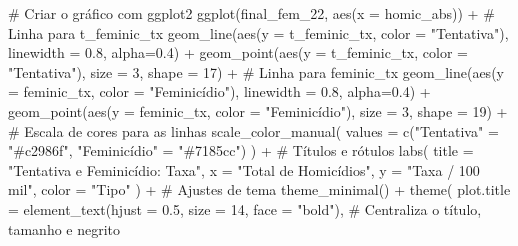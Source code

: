 \documentclass[
  letterpaper,
  DIV=11,
  numbers=noendperiod]{scrreprt}
\newenvironment{Shaded}{\begin{snugshade}}{\end{snugshade}}
\newcommand{\AttributeTok}[1]{\textcolor[rgb]{0.40,0.45,0.13}{#1}}
\newcommand{\CommentTok}[1]{\textcolor[rgb]{0.37,0.37,0.37}{#1}}
\newcommand{\DecValTok}[1]{\textcolor[rgb]{0.68,0.00,0.00}{#1}}
\newcommand{\FloatTok}[1]{\textcolor[rgb]{0.68,0.00,0.00}{#1}}
\newcommand{\FunctionTok}[1]{\textcolor[rgb]{0.28,0.35,0.67}{#1}}
\newcommand{\NormalTok}[1]{\textcolor[rgb]{0.00,0.23,0.31}{#1}}
\newcommand{\OtherTok}[1]{\textcolor[rgb]{0.00,0.23,0.31}{#1}}
\newcommand{\SpecialCharTok}[1]{\textcolor[rgb]{0.37,0.37,0.37}{#1}}
\newcommand{\StringTok}[1]{\textcolor[rgb]{0.13,0.47,0.30}{#1}}
\begin{document}
\begin{Shaded}
\begin{Highlighting}[]
\CommentTok{\# Criar o gráfico com ggplot2}
\FunctionTok{ggplot}\NormalTok{(final\_fem\_22, }\FunctionTok{aes}\NormalTok{(}\AttributeTok{x =}\NormalTok{ homic\_abs)) }\SpecialCharTok{+}
\CommentTok{\# Linha para \textquotesingle{}t\_feminic\_tx\textquotesingle{}}
  \FunctionTok{geom\_line}\NormalTok{(}\FunctionTok{aes}\NormalTok{(}\AttributeTok{y =}\NormalTok{ t\_feminic\_tx, }\AttributeTok{color =} \StringTok{"Tentativa"}\NormalTok{), }\AttributeTok{linewidth =} \FloatTok{0.8}\NormalTok{, }\AttributeTok{alpha=}\FloatTok{0.4}\NormalTok{) }\SpecialCharTok{+}
  \FunctionTok{geom\_point}\NormalTok{(}\FunctionTok{aes}\NormalTok{(}\AttributeTok{y =}\NormalTok{ t\_feminic\_tx, }\AttributeTok{color =} \StringTok{"Tentativa"}\NormalTok{), }\AttributeTok{size =} \DecValTok{3}\NormalTok{, }\AttributeTok{shape =} \DecValTok{17}\NormalTok{) }\SpecialCharTok{+}
\CommentTok{\# Linha para \textquotesingle{}feminic\_tx\textquotesingle{}}
  \FunctionTok{geom\_line}\NormalTok{(}\FunctionTok{aes}\NormalTok{(}\AttributeTok{y =}\NormalTok{ feminic\_tx, }\AttributeTok{color =} \StringTok{"Feminicídio"}\NormalTok{), }\AttributeTok{linewidth =} \FloatTok{0.8}\NormalTok{, }\AttributeTok{alpha=}\FloatTok{0.4}\NormalTok{) }\SpecialCharTok{+}
  \FunctionTok{geom\_point}\NormalTok{(}\FunctionTok{aes}\NormalTok{(}\AttributeTok{y =}\NormalTok{ feminic\_tx, }\AttributeTok{color =} \StringTok{"Feminicídio"}\NormalTok{), }\AttributeTok{size =} \DecValTok{3}\NormalTok{, }\AttributeTok{shape =} \DecValTok{19}\NormalTok{) }\SpecialCharTok{+}
\CommentTok{\# Escala de cores para as linhas}
  \FunctionTok{scale\_color\_manual}\NormalTok{(}
    \AttributeTok{values =} \FunctionTok{c}\NormalTok{(}\StringTok{"Tentativa"} \OtherTok{=} \StringTok{"\#c2986f"}\NormalTok{, }\StringTok{"Feminicídio"} \OtherTok{=} \StringTok{"\#7185cc"}\NormalTok{)}
\NormalTok{  ) }\SpecialCharTok{+}
\CommentTok{\# Títulos e rótulos}
  \FunctionTok{labs}\NormalTok{(}
    \AttributeTok{title =} \StringTok{"Tentativa e Feminicídio: Taxa"}\NormalTok{,}
    \AttributeTok{x =} \StringTok{"Total de Homicídios"}\NormalTok{,}
    \AttributeTok{y =} \StringTok{"Taxa / 100 mil"}\NormalTok{,}
    \AttributeTok{color =} \StringTok{"Tipo"}
\NormalTok{  ) }\SpecialCharTok{+}
 \CommentTok{\# Ajustes de tema}
  \FunctionTok{theme\_minimal}\NormalTok{() }\SpecialCharTok{+}
  \FunctionTok{theme}\NormalTok{(}
    \AttributeTok{plot.title =} \FunctionTok{element\_text}\NormalTok{(}\AttributeTok{hjust =} \FloatTok{0.5}\NormalTok{, }\AttributeTok{size =} \DecValTok{14}\NormalTok{, }\AttributeTok{face =} \StringTok{"bold"}\NormalTok{),  }\CommentTok{\# Centraliza o título, tamanho e negrito}

\end{Highlighting}
\end{Shaded}
\end{document}
